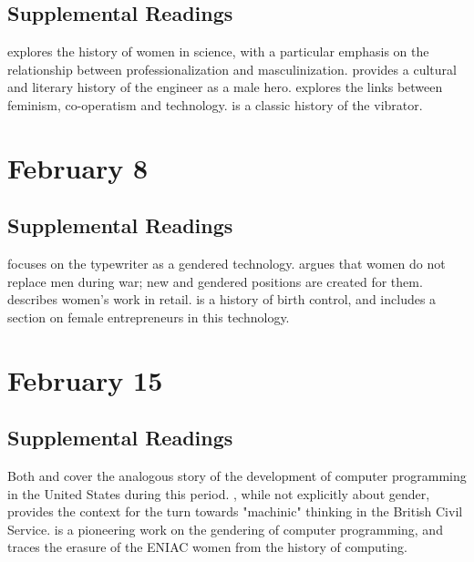 \documentclass[11pt]{article}
\begin{document}

\subsection{Supplemental Readings}

\cite{Rossiter1982} explores the history of women in science, with a particular emphasis on the relationship between professionalization and masculinization.   \cite{Tichi1987} provides a cultural and literary history of the engineer as a male hero. \cite{Hacker1989} explores the links between feminism, co-operatism and technology.  \cite{Maines1999} is a classic history of the vibrator.

\section{February 8}


\subsection{Supplemental Readings}

\cite{Davies1982} focuses on the typewriter as a gendered technology.
\cite{Milkman1987} argues that women do not replace men during war;
new and gendered positions are created for them. \cite{Benson1987}
describes women's work in retail. \cite{Tone2001} is a history of
birth control, and includes a section on female entrepreneurs in this
technology.

\section{February 15}


\subsection{Supplemental Readings}

Both \cite{Ensmenger2010} and \cite{Abbate2012} cover the
analogous story of the development of computer programming in the United
States during this period. \cite{Agar2003}, while not explicitly
about gender, provides the context for the turn towards "machinic"
thinking in the British Civil Service. \cite{Edwards1990} is a pioneering work on the gendering of computer programming, and \cite{Light1999} traces the erasure of the ENIAC women from the history of computing.
\end{document}
